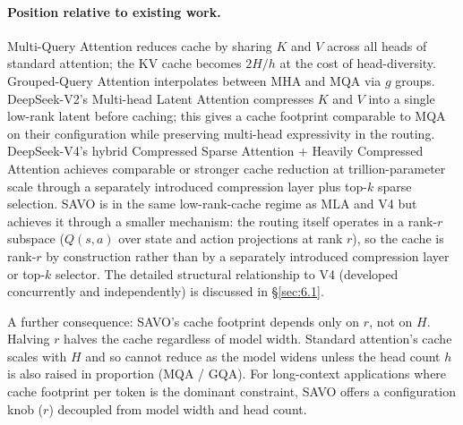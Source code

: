 \paragraph{Position relative to existing work.} Multi-Query Attention \cite{ref24} reduces cache by sharing $K$ and $V$ across
all heads of standard attention; the KV cache becomes $2H/h$ at the cost of head-diversity. Grouped-Query
Attention \cite{ref9} interpolates between MHA and MQA via $g$ groups. DeepSeek-V2's Multi-head
Latent Attention \cite{ref23} compresses $K$ and $V$ into a single low-rank latent before caching; this gives a
cache footprint comparable to MQA on their configuration while preserving multi-head expressivity in
the routing. DeepSeek-V4's hybrid Compressed Sparse Attention + Heavily Compressed Attention \cite{ref18}
achieves comparable or stronger cache reduction at trillion-parameter scale through a separately introduced
compression layer plus top-$k$ sparse selection. SAVO is in the same low-rank-cache regime as
MLA and V4 but achieves it through a smaller mechanism: the routing itself operates in a rank-$r$ subspace
($Q(s, a)$ over state and action projections at rank $r$), so the cache is rank-$r$ by construction rather than by
a separately introduced compression layer or top-$k$ selector. The detailed structural relationship to V4
(developed concurrently and independently) is discussed in \S\ref{sec:6.1}.

A further consequence: SAVO's cache footprint depends only on $r$, not on $H$. Halving $r$ halves
the cache regardless of model width. Standard attention's cache scales with $H$ and so cannot reduce as
the model widens unless the head count $h$ is also raised in proportion (MQA / GQA). For long-context
applications where cache footprint per token is the dominant constraint, SAVO offers a configuration
knob ($r$) decoupled from model width and head count.

